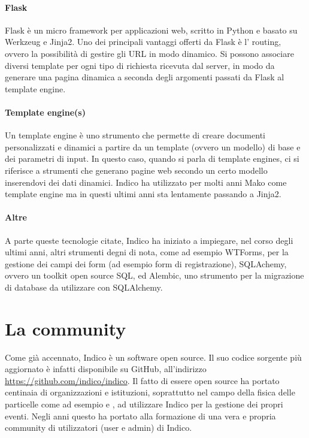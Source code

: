 		\paragraph{Flask}Flask è un micro framework per applicazioni web, scritto in Python e basato su Werkzeug e Jinja2. Uno dei principali vantaggi offerti da Flask è l' routing, ovvero la  possibilità di gestire gli \ac{URL} in modo dinamico. Si possono associare diversi template per ogni tipo di richiesta ricevuta dal server, in modo da generare una pagina dinamica a seconda degli argomenti passati da Flask al template engine. \cite{indico:flask}
		
		\paragraph{Template engine(s)}Un template engine è uno strumento che permette di creare documenti personalizzati e dinamici a partire da un template (ovvero un modello) di base e dei parametri di input. In questo caso, quando si parla di template engines, ci si riferisce a strumenti che generano pagine web secondo un certo modello inserendovi dei dati dinamici. Indico ha utilizzato per molti anni Mako come template engine ma in questi ultimi anni sta lentamente passando a Jinja2. \cite{indico:template_engines}
		
		\paragraph{Altre}A parte queste tecnologie citate, Indico ha iniziato a impiegare, nel corso degli ultimi anni, altri strumenti degni di nota, come  ad esempio WTForms, per la gestione dei campi dei form (ad esempio form di registrazione), SQLAchemy, ovvero un toolkit open source SQL, ed Alembic, uno strumento per la migrazione di database da utilizzare con SQLAlchemy.
		
	\section{La community} \label{sec:i;community}
	
		Come già accennato,  Indico è un software open source. Il suo codice sorgente più aggiornato è infatti disponibile su GitHub, all'indirizzo \url{https://github.com/indico/indico}. Il fatto di essere open source ha portato centinaia di organizzazioni e istituzioni, soprattutto nel campo della fisica delle particelle come ad esempio  e , ad utilizzare Indico per la gestione dei propri eventi. Negli anni questo ha portato alla formazione di una vera e propria community di utilizzatori (user e admin) di Indico.
		
